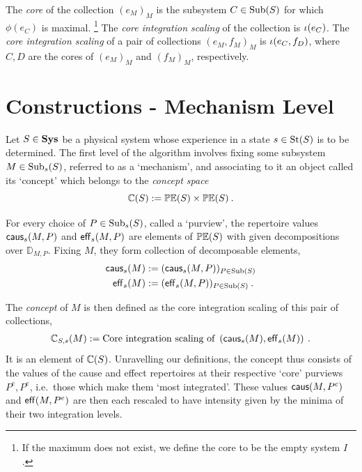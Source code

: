 \begin{definition}\label{def:IntScalingColl}
The \emph{core} of the collection $(e_M)_{M}$ is the subsystem $C \in \mathrm{Sub}(S)$ for which $\phi(e_C)$ is maximal.%
\footnote{If the maximum does not exist, we define the core to be the empty system $I$.}
The \emph{core integration scaling} of the collection is $\iota(e_C)$.
The \emph{core integration scaling} of a pair of collections $(e_M, f_M)_{M}$ is
$\iota(e_{C}, f_{D})$, where $C, D$ are the cores of $(e_M)_M$ and $(f_M)_M$, respectively.
\end{definition}


\section{Constructions - Mechanism Level} \label{sec:alg-mech}

Let $S \in \mathbf{Sys}$ be a physical system whose experience in a state $s \in \text{St}(S)$ is to be determined.
The first level of the algorithm involves fixing some subsystem $M \in \mathrm{Sub}_s(S)$, referred to as a `mechanism', and associating to it an object called its `concept' which belongs to the \emph{concept space}
\begin{equation}\label{eq:Concepts}
\mathbb{C}(S) := \mathbb{PE}(S) \times \mathbb{PE}(S) \:.
\end{equation}


For every choice of $P \in \mathrm{Sub}_s(S)$, called a `purview', the repertoire values $\mathsf{caus}_s(M,P)$ and $\mathsf{eff}_s(M,P)$ are elements of $\mathbb{PE}(S)$ with given decompositions over $\mathbb{D}_{M,P}$. Fixing $M$, they form collection of decomposable elements,
\begin{align}\begin{split}\label{eq:CER}
\mathsf{caus}_s(M) &:= (\mathsf{caus}_s(M,P))_{P \in \mathrm{Sub}(S)} \\
\mathsf{eff}_s(M) &:= (\mathsf{eff}_s(M,P))_{P \in \mathrm{Sub}(S)} \:.
\end{split}\end{align}


The \emph{concept} of $M$ is then defined as the core integration scaling of this pair of collections,
\begin{equation}\begin{split}\label{eq:DefConcept}
\mathbb{C}_{S,s}(M) := \textrm{Core integration scaling of }  \left(\mathsf{caus}_s(M), \mathsf{eff}_s(M) \right) \:.
\end{split}\end{equation}
It is an element of $\mathbb{C}(S)$. Unravelling our definitions, the concept thus consists of the values of the cause and effect repertoires at their respective `core' purviews $P^c, P^e$, i.e.~those which make them `most integrated'. These values $\mathsf{caus}(M,P^c)$ and $\mathsf{eff}(M,P^e)$ are then each rescaled to have intensity given by the minima of their two integration levels.

